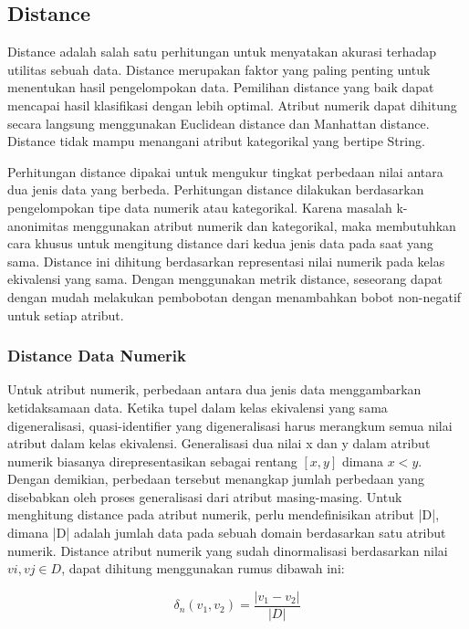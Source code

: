 \subsection{Distance} 
Distance adalah salah satu perhitungan untuk menyatakan akurasi terhadap utilitas sebuah data. Distance merupakan faktor yang paling penting untuk menentukan hasil pengelompokan data. Pemilihan distance yang baik dapat mencapai hasil klasifikasi dengan lebih optimal. Atribut numerik dapat dihitung secara langsung menggunakan  Euclidean distance dan Manhattan distance. Distance tidak mampu menangani atribut kategorikal yang bertipe String. 

\par Perhitungan distance dipakai untuk mengukur tingkat perbedaan nilai antara dua jenis data yang berbeda. Perhitungan distance dilakukan berdasarkan pengelompokan tipe data numerik atau kategorikal. Karena masalah k-anonimitas menggunakan atribut numerik dan kategorikal, maka membutuhkan cara khusus untuk mengitung distance dari kedua jenis data pada saat yang sama. Distance ini dihitung berdasarkan representasi nilai numerik pada kelas ekivalensi yang sama. Dengan menggunakan metrik distance, seseorang dapat dengan mudah melakukan pembobotan dengan menambahkan bobot non-negatif untuk setiap atribut.

\subsubsection{Distance Data Numerik}
Untuk atribut numerik, perbedaan antara dua jenis data menggambarkan ketidaksamaan data. Ketika tupel dalam kelas ekivalensi yang sama digeneralisasi, quasi-identifier yang digeneralisasi harus merangkum semua nilai atribut dalam kelas ekivalensi. Generalisasi dua nilai x dan y dalam atribut numerik biasanya direpresentasikan sebagai rentang $[x,y]$ dimana $x < y$. Dengan demikian, perbedaan tersebut menangkap jumlah perbedaan yang disebabkan oleh proses generalisasi dari atribut masing-masing. Untuk menghitung distance pada atribut numerik, perlu mendefinisikan atribut |D|, dimana |D| adalah jumlah data pada sebuah domain berdasarkan satu atribut numerik. Distance atribut numerik yang sudah dinormalisasi berdasarkan nilai $vi, vj \in D$,  dapat dihitung menggunakan rumus dibawah ini:

\begin{equation}
\delta_n(v_1,v_2) = \frac{|v_1 - v_2|}{|D|} 
\end{equation}

